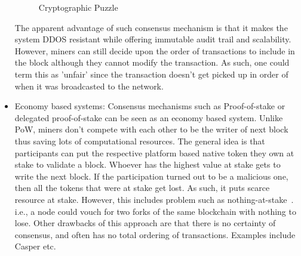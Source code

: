 \begin{itemize}
\begin{figure}
\begin{center}
			\caption{Cryptographic Puzzle}
			\label{fig:cryptographicPuzzle}
			\end{center}
		\end{figure}
		The apparent advantage of such consensus mechanism is that it makes the
		system DDOS resistant while offering immutable audit trail and
		scalability.  However, miners can still decide upon the order of
		transactions to include in the block although they cannot modify the
		transaction. As such, one could term this as 'unfair' since the
		transaction doesn't get picked up in order of when it was broadcasted
		to the network. 
	\item Economy based systems: Consensus mechanisms such as Proof-of-stake or
		delegated proof-of-stake can be seen as an economy based system. Unlike
		PoW, miners don't compete with each other to be the writer of next
		block thus saving lots of computational resources. The general idea is
		that participants can put the respective platform based native token
		they own at stake to validate a block. Whoever has the highest value at
		stake gets to write the next block. If the participation turned out to
		be a malicious one, then all the tokens that were at stake get lost. As
		such, it puts scarce resource at stake. However, this includes problem
		such as nothing-at-stake~\cite{houy2014will}. i.e., a node could vouch for two forks
		of the same blockchain with nothing to lose. Other drawbacks of this
		approach are that there is no certainty of consensus, and often has no
		total ordering of transactions. Examples include Casper etc. 
\end{itemize}

